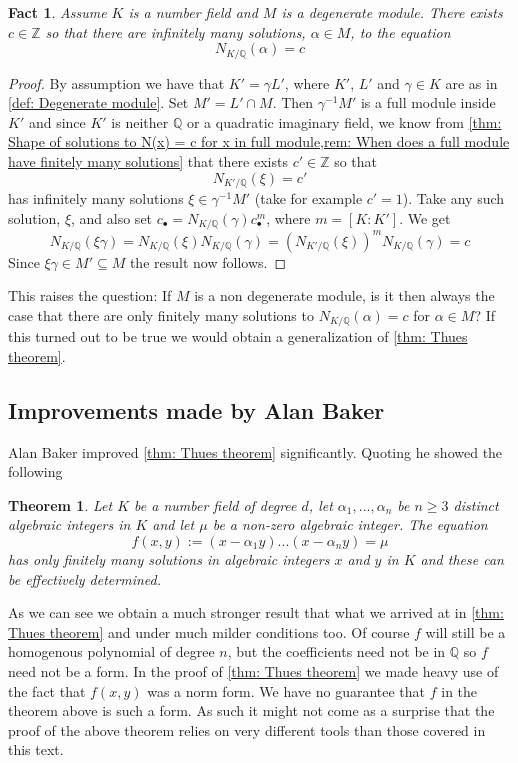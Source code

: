 \documentclass{article}
\newtheorem{theorem}{Theorem}[section]
\newtheorem{fact}{Fact}[section]
\newcommand{\mbb}[1]{\mathbb{#1}}
\numberwithin{equation}{section}
\begin{document}
\begin{fact}
    Assume $K$ is a number field and $M$ is a degenerate module. There exists $c \in \mbb Z$ so that there are infinitely many solutions, $\alpha \in M$, to the equation
    $$N_{K / \mbb Q}(\alpha) = c$$
\end{fact}
\begin{proof}
    By assumption we have that $K' = \gamma L'$, where $K'$, $L'$ and $\gamma \in K$ are as in \cref{def: Degenerate module}. Set $M' = L' \cap M$. Then $\gamma^{-1}M'$ is a full module inside $K'$ and since $K'$ is neither $\mbb Q$ or a quadratic imaginary field, we know from \cref{thm: Shape of solutions to N(x) = c for x in full module,rem: When does a full module have finitely many solutions} that there exists $c' \in \mbb Z$ so that
    $$N_{K' / \mbb Q}(\xi) = c'$$
    has infinitely many solutions $\xi \in \gamma^{-1}M'$ (take for example $c' = 1$). Take any such solution, $\xi$, and also set $c_\bullet = N_{K / \mbb Q}(\gamma)c_\bullet^m$, where $m = [K : K']$. We get
    $$N_{K / \mbb Q}(\xi \gamma) = N_{K / \mbb Q}(\xi) N_{K / \mbb Q}(\gamma) = (N_{K' / \mbb Q}(\xi))^m N_{K / \mbb Q}(\gamma) = c$$
    Since $\xi\gamma \in M' \subseteq M$ the result now follows.
\end{proof}
This raises the question: If $M$ is a non degenerate module, is it then always the case that there are only finitely many solutions to $N_{K/\mbb Q}(\alpha) = c$
for $\alpha \in M$? If this turned out to be true we would obtain a generalization of \cref{thm: Thues theorem}.

\subsection{Improvements made by Alan Baker}\label{sec: improvements by baker}
Alan Baker improved \cref{thm: Thues theorem} significantly. Quoting \citep[Theorem 4.1]{baker} he showed the following
\begin{theorem}
    Let $K$ be a number field of degree $d$, let $\alpha_1, ..., \alpha_n$ be $n \geq 3$ distinct algebraic integers in $K$ and let $\mu$ be a non-zero algebraic integer. The equation
    $$f(x, y) := (x - \alpha_1 y) ... (x - \alpha_n y) = \mu$$
    has only finitely many solutions in algebraic integers $x$ and $y$ in $K$ and these can be effectively determined.
\end{theorem}
As we can see we obtain a much stronger result that what we arrived at in \cref{thm: Thues theorem} and under much milder conditions too. Of course $f$ will still be a homogenous polynomial of degree $n$, but the coefficients need not be in $\mbb Q$ so $f$ need not be a form. In the proof of \cref{thm: Thues theorem} we made heavy use of the fact that $f(x, y)$ was a norm form. We have no guarantee that $f$ in the theorem above is such a form. As such it might not come as a surprise that the proof of the above theorem relies on very different tools than those covered in this text.



\end{document}
